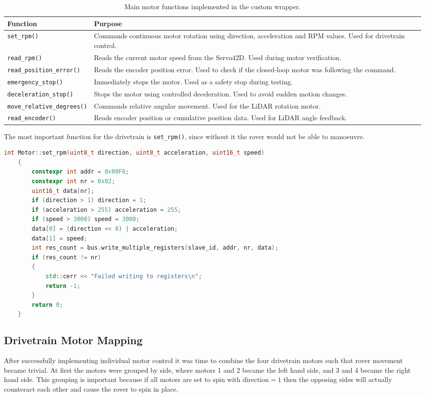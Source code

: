 \begin{table}[H]
\centering
\caption{Main motor functions implemented in the custom wrapper.}
\label{tab:motor_functions}
\begin{tabular}{p{} p{}}
\hline
Function & Purpose \\
\hline
\texttt{set\_rpm()} & Commands continuous motor rotation using direction, acceleration and RPM values. Used for drivetrain control. \\
\texttt{read\_rpm()} & Reads the current motor speed from the Servo42D. Used during motor verification. \\
\texttt{read\_position\_error()} & Reads the encoder position error. Used to check if the closed-loop motor was following the command. \\
\texttt{emergency\_stop()} & Immediately stops the motor. Used as a safety stop during testing. \\
\texttt{deceleration\_stop()} & Stops the motor using controlled deceleration. Used to avoid sudden motion changes. \\
\texttt{move\_relative\_degrees()} & Commands relative angular movement. Used for the LiDAR rotation motor. \\
\texttt{read\_encoder()} & Reads encoder position or cumulative position data. Used for LiDAR angle feedback. \\
\hline
\end{tabular}
\end{table}

The most important function for the drivetrain is \texttt{set\_rpm()}, since without it the rover would not be able to manoeuvre.
\begin{lstlisting}[language=C++, caption={RPM commanding function}, label={lst:set_rpm}]
    int Motor::set_rpm(uint8_t direction, uint8_t acceleration, uint16_t speed)
    {
        constexpr int addr = 0x00F6;
        constexpr int nr = 0x02;
        uint16_t data[nr];
        if (direction > 1) direction = 1;
        if (acceleration > 255) acceleration = 255;
        if (speed > 3000) speed = 3000;
        data[0] = (direction << 8) | acceleration;
        data[1] = speed;
        int res_count = bus.write_multiple_registers(slave_id, addr, nr, data);
        if (res_count != nr)
        {
            std::cerr << "Failed writing to registers\n";
            return -1;
        }
        return 0;
    }
\end{lstlisting}

\subsection{Drivetrain Motor Mapping}
After successfully implementing individual motor control it was time to combine the four drivetrain motors such that rover movement became trivial.
At first the motors were grouped by side, where motors 1 and 2 became the left hand side, and 3 and 4 became the right hand side. 
This grouping is important because if all motors are set to spin with \(\mathrm{direction} = 1\) then the opposing sides will actually counteract each other and cause the rover to spin in place.

